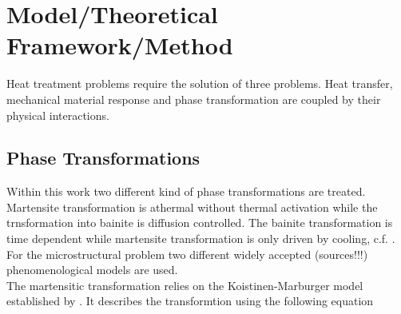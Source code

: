 \chapter{Model/Theoretical Framework/Method}
\thispagestyle{fancy}
\label{chap:model}
Heat treatment problems require the solution of three problems. Heat transfer, mechanical material response and phase transformation are coupled by their physical interactions. 

\section{Phase Transformations}

Within this work two different kind of phase transformations are treated. Martensite transformation is athermal without thermal activation while the trnsformation into bainite is diffusion controlled. The bainite transformation is time dependent while martensite transformation is only driven by cooling, c.f. \cite{totten_steel_2007}. \\

For the microstructural problem two different widely accepted (sources!!!) phenomenological models are used.\\
The martensitic transformation relies on the Koistinen-Marburger model established by \cite{koistinen_general_1959}. It describes the transformtion using the following equation \\\\

